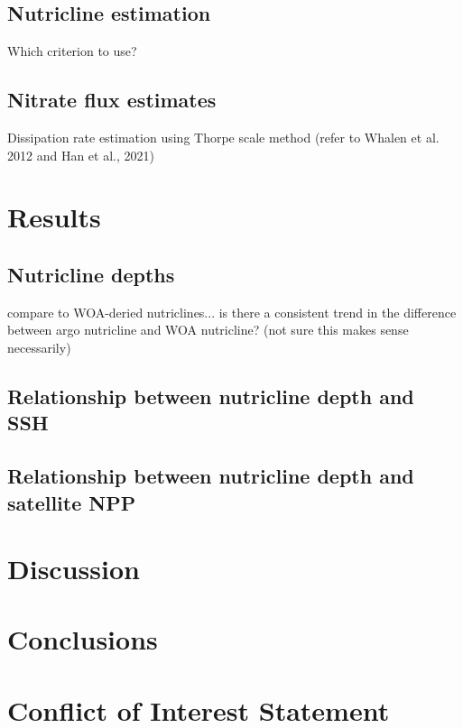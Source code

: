 \documentclass[utf8]{frontiersSCNS} %
\begin{document}
\subsection{Nutricline estimation}
Which criterion to use? 

\subsection{Nitrate flux estimates}
Dissipation rate estimation using Thorpe scale method (refer to Whalen et al. 2012 and Han et al., 2021)


\section{Results}
\subsection{Nutricline depths}
compare to WOA-deried nutriclines... is there a consistent trend in the difference between argo nutricline and WOA nutricline? (not sure this makes sense necessarily)

\subsection{Relationship between nutricline depth and SSH}

\subsection{Relationship between nutricline depth and satellite NPP}


\section{Discussion}


\section{Conclusions}


\section*{Conflict of Interest Statement}
\end{document}

